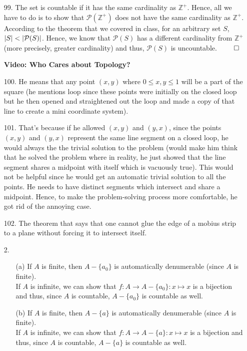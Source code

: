\documentclass[12pt, a4paper]{article}
\newcommand{\pints}{\mathbb{Z}^+}
\newcommand\und[1]{\underline{\smash{#1}}}
\DeclarePairedDelimiter\abs{\lvert}{\rvert}
\newcommand{\rarr}{\rightarrow}
\begin{document}
\begin{itemize}
\item[]

\item[99.]
The set is countable if it has the same cardinality as $\pints$.
Hence, all we have to do is to show that $\mathcal{P}(\pints)$ does
not have the same cardinality as $\pints$. According to the
theorem that we covered in class, for an arbitrary set $S$, $\abs{S} < \abs{\mathcal{P}(S)}$.
Hence, we know that $\mathcal{P}(S)$ has a different cardinality from $\pints$ (more precisely, greater cardinality)
and thus, $\mathcal{P}(S)$ is uncountable.
$\qed$

\item[]
\item[]

{\Large \textbf{Video: Who Cares about Topology?}}
\item[100.]
He means that any point $(x, y)$ where $0 \leq x, y \leq 1$ will be a part
of the square (he mentions loop since these points were initially on the closed loop but he then opened
and straightened out the loop and made a copy of that line to create a mini coordinate system).
\item[101.]
That's because if he allowed $(x, y)$ and $(y, x)$, since the points $(x, y)$ and $(y, x)$
represent the same line segment on a closed loop, he would always the the trivial solution to the problem (would make him think that he solved the problem where in reality, he just showed that the line segment shares a midpoint with itself which is vacuously true).
This would not be helpful since he would get an automatic trivial
solution to all the points. He needs to have distinct segments which intersect and share a midpoint.
Hence, to make the problem-solving process more comfortable, he got rid of the annoying case.

\item[102.]
The theorem that says that one cannot glue the edge of a mobius strip to a plane without forcing it to intersect itself.

\item[]
\item[]

{\und{\large Section 5.3}}
\item[2.]
\begin{itemize}
\item[(a)]
If $A$ is finite, then $A - \{a_0\}$ is automatically denumerable (since $A$ is finite).\\
If $A$ is infinite, we can show that $f : A \rarr A - \{a_0\} : x \mapsto x$ is a bijection and thus, since
$A$ is countable, $A - \{a_0\}$ is countable as well.
\item[(b)]
If $A$ is finite, then $A - \{a\}$ is automatically denumerable (since $A$ is finite).\\
If $A$ is infinite, we can show that $f : A \rarr A - \{a\} : x \mapsto x$ is a bijection and thus, since
$A$ is countable, $A - \{a\}$ is countable as well.
\end{itemize}


\end{itemize}
\end{document}

